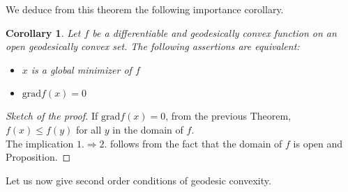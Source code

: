 \documentclass[10pt,a4paper]{book}
\theoremstyle{definition}
\theoremstyle{plain}
\newtheorem{cor}{Corollary}[section]
\theoremstyle{remark}
\newcommand{\grad}{\textrm{grad}}
\begin{document}
We deduce from this theorem the following importance corollary.
\begin{cor}
Let $f$ be a differentiable and geodesically convex function on an open geodesically convex set. The following assertions are equivalent:
\begin{itemize}
\item[(i)] $x$ is a global minimizer of $f$
\item[(ii)] $\grad f(x)=0$
\end{itemize}
\end{cor}
\begin{proof}[Sketch of the proof]
If $\grad f(x)=0$, from the previous Theorem, $f(x)\le f(y)$ for all $y$ in the domain of $f$. \\ The implication $1. \Rightarrow 2.$ follows from the fact that the domain of $f$ is open and Proposition.
\end{proof}
Let us now give second order conditions of geodesic convexity.
\end{document}

